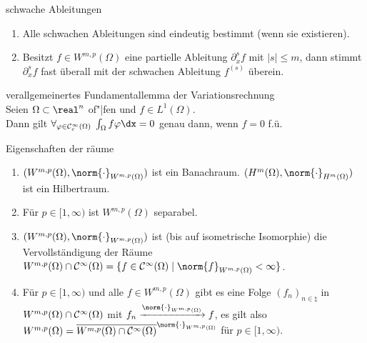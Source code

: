 \linie
\pagebreak

\begin{Satz}{schwache Ableitungen}
    \begin{enumerate}
        \item
        Alle schwachen Ableitungen sind eindeutig bestimmt (wenn sie existieren).

        \item
        Besitzt $f \in W^{m,p}(\Omega)$ eine partielle Ableitung $\partial_x^s f$ mit $|s| \le m$,
        dann stimmt $\partial_x^s f$ fast überall mit der schwachen Ableitung $f^{(s)}$ überein.
    \end{enumerate}
\end{Satz}

\begin{Lemma}{verallgemeinertes Fundamentallemma der Variationsrechnung}\\
    Seien $\Omega \subset \real^n$ of"|fen und $f \in L^1(\Omega)$.\\
    Dann gilt $\forall_{\varphi \in \C^\infty_c(\Omega)}\; \int_\Omega f\varphi \dx = 0$
    genau dann, wenn $f = 0$ f.ü.
\end{Lemma}

\begin{Satz}{Eigenschaften der räume}
    \begin{enumerate}
        \item
        $(W^{m,p}(\Omega), \norm{\cdot}_{W^{m,p}(\Omega)})$ ist ein Banachraum.
        $(H^m(\Omega), \norm{\cdot}_{H^m(\Omega)})$ ist ein Hilbertraum.

        \item
        Für $p \in [1, \infty)$ ist $W^{m,p}(\Omega)$ separabel.

        \item
        $(W^{m,p}(\Omega), \norm{\cdot}_{W^{m,p}(\Omega)})$ ist
        (bis auf isometrische Isomorphie) die Vervollständigung der Räume
        $W^{m,p}(\Omega) \cap \C^\infty(\Omega) =
        \{f \in \C^\infty(\Omega) \;|\; \norm{f}_{W^{m,p}(\Omega)} < \infty\}$.

        \item
        Für $p \in [1, \infty)$ und alle $f \in W^{m,p}(\Omega)$ gibt es eine Folge
        $(f_n)_{n \in \natural}$ in $W^{m,p}(\Omega) \cap \mathcal{C}^\infty(\Omega)$ mit
        $f_n \xrightarrow{\norm{\cdot}_{W^{m,p}(\Omega)}} f$,
        es gilt also $W^{m,p}(\Omega) =
        \overline{W^{m,p}(\Omega) \cap \C^\infty(\Omega)}^{\norm{\cdot}_{W^{m,p}(\Omega)}}$
        für $p \in [1, \infty)$.
    \end{enumerate}
\end{Satz}

